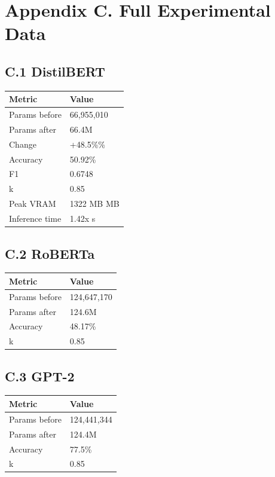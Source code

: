 \section{Appendix C. Full Experimental Data}

\subsection{C.1 DistilBERT}

\begin{table}[H]
\centering
\small
\begin{tabular}{ll}
\toprule
\textbf{Metric} & \textbf{Value} \\
\midrule
Params before & 66,955,010 \\
Params after & 66.4M \\
Change & +48.5\%\% \\
Accuracy & 50.92\% \\
F1 & 0.6748 \\
k & 0.85 \\
Peak VRAM & 1322 MB MB \\
Inference time & 1.42x s \\
\bottomrule
\end{tabular}
\end{table}

\subsection{C.2 RoBERTa}

\begin{table}[H]
\centering
\small
\begin{tabular}{ll}
\toprule
\textbf{Metric} & \textbf{Value} \\
\midrule
Params before & 124,647,170 \\
Params after & 124.6M \\
Accuracy & 48.17\% \\
k & 0.85 \\
\bottomrule
\end{tabular}
\end{table}

\subsection{C.3 GPT-2}

\begin{table}[H]
\centering
\small
\begin{tabular}{ll}
\toprule
\textbf{Metric} & \textbf{Value} \\
\midrule
Params before & 124,441,344 \\
Params after & 124.4M \\
Accuracy & 77.5\% \\
k & 0.85 \\
\bottomrule
\end{tabular}
\end{table}

